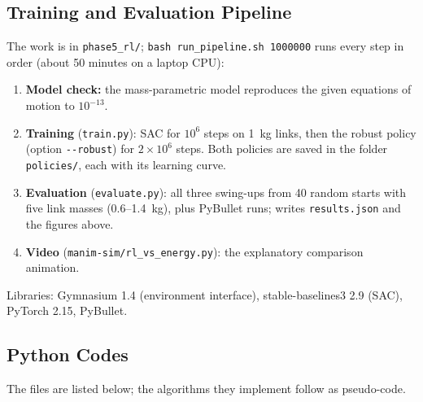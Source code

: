 \documentclass[12pt,a4paper]{article}
\begin{document}
\subsection{Training and Evaluation Pipeline}
The work is in \texttt{phase5\_rl/}; \texttt{bash run\_pipeline.sh 1000000} runs every step in order (about 50 minutes on a laptop CPU):
\begin{enumerate}
\item \textbf{Model check:} the mass-parametric model reproduces the given equations of motion to $10^{-13}$.
\item \textbf{Training} (\texttt{train.py}): SAC for $10^6$ steps on 1~kg links, then the robust policy (option \texttt{-{}-robust}) for $2\times10^6$ steps. Both policies are saved in the folder \texttt{policies/}, each with its learning curve.
\item \textbf{Evaluation} (\texttt{evaluate.py}): all three swing-ups from 40 random starts with five link masses (0.6--1.4~kg), plus PyBullet runs; writes \texttt{results.json} and the figures above.
\item \textbf{Video} (\texttt{manim-sim/rl\_vs\_energy.py}): the explanatory comparison animation.
\end{enumerate}
Libraries: Gymnasium 1.4 (environment interface), stable-baselines3 2.9 (SAC), PyTorch 2.15, PyBullet.

\subsection{Python Codes}
The files are listed below; the algorithms they implement follow as pseudo-code.
\begin{table}[H]
\centering
\caption{Python files (\texttt{phase5\_rl/})}
\end{table}
\end{document}
